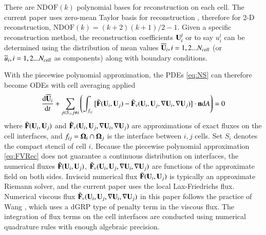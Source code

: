 \documentclass[preprint,12pt]{elsarticle}
\begin{document}
There are $\mathrm{NDOF}(k)$ polynomial bases for reconstruction on
each cell.
The current paper uses zero-mean Taylor basis
for reconstruction \cite{wang2017compact_VR}, therefore
for 2-D reconstruction, $\mathrm{NDOF}(k) = (k+2)(k+1)/2 -1$.
Given a specific reconstruction method,
the reconstruction coefficients $\mathbf{U}_i^l$ or to say $u_i^l$
can be determined using
the distribution of mean values $\overline{\mathbf{U}}_i, i=1,2...N_{cell}$
(or
$\overline{u}_i, i=1,2...N_{cell}$ as components)
along with boundary conditions.

With the piecewise polynomial approximation,
the PDEs \eqref{eq:NS} can therefore become ODEs
with cell averaging applied
\begin{equation}
    \label{eq:FVInt}
    \frac{\dd\overline{\mathbf{U}}_i}{\dd t}
    +\sum_{j\in S_i, j\neq i}{\left(
        \int_{f_{ij}}{
            [\tilde{\mathbf{F}}(\mathbf{U}_i,\mathbf{U}_j) - \tilde{\mathbf{F}}_v(\mathbf{U}_i,\mathbf{U}_j, \nabla \mathbf{U}_i, \nabla \mathbf{U}_j)] \cdot \mathbf{n}  \dd A
        }\right)
    }
    = 0
\end{equation}
where $\tilde{\mathbf{F}}(\mathbf{U}_i,\mathbf{U}_j)$ and $\tilde{\mathbf{F}}_v(\mathbf{U}_i,\mathbf{U}_j, \nabla \mathbf{U}_i, \nabla \mathbf{U}_j)$ are approximations
of exact fluxes on the cell interfaces,
and $f_{ij}=\mathbf{\Omega}_i \cap \mathbf{\Omega}_j$ is the interface between $i,j$ cells.
Set $S_i$ denotes the compact stencil of cell $i$.
Because the piecewise polynomial approximation \eqref{eq:FVRec} does not
guarantee a continuous distribution on interfaces,
the numerical fluxes
$\tilde{\mathbf{F}}(\mathbf{U}_i,\mathbf{U}_j)$, $\tilde{\mathbf{F}}_v(\mathbf{U}_i,\mathbf{U}_j, \nabla \mathbf{U}_i, \nabla \mathbf{U}_j)$ are
functions of the approximate field on both sides.
Inviscid numerical
flux $\tilde{\mathbf{F}}(\mathbf{U}_i,\mathbf{U}_j)$ is typically an approximate Riemann solver,
and the current paper uses the local Lax-Friedrichs flux.
Numerical viscous flux $\tilde{\mathbf{F}}_v(\mathbf{U}_i,\mathbf{U}_j, \nabla \mathbf{U}_i, \nabla \mathbf{U}_j)$
in this paper follows the practice of Wang \cite{wang2017compact_VR},
which uses a dGRP type of penalty term in the viscous flux.
The integration of flux terms on the cell interfaces
are conducted using numerical quadrature rules with
enough algebraic precision.
\end{document}
